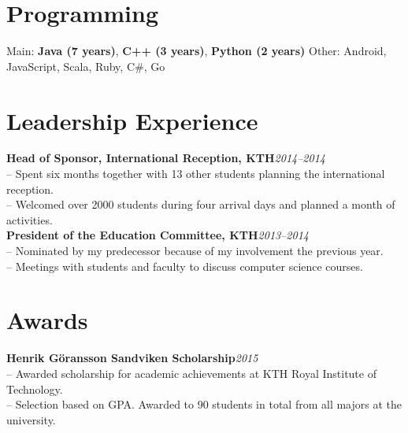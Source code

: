 \documentclass[10pt]{article}
\begin{document}
\section*{Programming}
\indent Main: \textbf{Java (7 years)}, \textbf{C++ (3 years)}, \textbf{Python (2 years)}\hspace{2em} Other: Android, JavaScript, Scala, Ruby, C\#, Go\\

\section*{Leadership Experience}
\noindent\textbf{Head of Sponsor, International Reception, KTH}\hfill\textit{2014--2014} \\
\indent-- Spent six months together with 13 other students planning the international reception.\\
\indent-- Welcomed over 2000 students during four arrival days and planned a month of activities. \\

\noindent\textbf{President of the Education Committee, KTH}\hfill\textit{2013--2014} \\
\indent-- Nominated by my predecessor because of my involvement the previous year.\\
\indent-- Meetings with students and faculty to discuss computer science courses.\\

\section*{Awards}
\textbf{Henrik Göransson Sandviken Scholarship}\hfill\textit{2015}\\
\indent-- Awarded scholarship for academic achievements at KTH Royal Institute of Technology.\\
\indent-- Selection based on GPA. Awarded to 90 students in total from all majors at the university.\\
\end{document}
